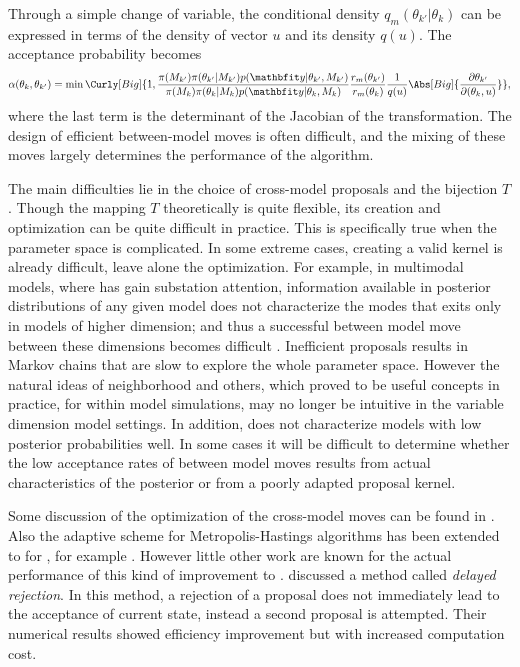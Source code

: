 Through a simple change of variable, the conditional density
$q_m(\theta_{k'}|\theta_k)$ can be expressed in terms of the density of vector
$u$ and its density $q(u)$. The acceptance probability becomes
\begin{equation}
  \alpha(\theta_k,\theta_{k'}) =
  \min\Curly[Big]{1,
    \frac{\pi(M_{k'})\pi(\theta_{k'}|M_{k'})p(\data|\theta_{k'},M_{k'})}
    {\pi(M_k)\pi(\theta_k|M_k)p(\data|\theta_k,M_k)}
    \frac{r_m(\theta_{k'})}{r_m(\theta_k)}
    \frac{1}{q(u)}
    \Abs[Big]{\frac{\partial\theta_{k'}}{\partial(\theta_k,u)}}
  },
\end{equation}
where the last term is the determinant of the Jacobian of the transformation.
The design of efficient between-model moves is often difficult, and the mixing
of these moves largely determines the performance of the algorithm.

The main difficulties lie in the choice of cross-model proposals and the
bijection $T$. Though the mapping $T$ theoretically is quite flexible, its
creation and optimization can be quite difficult in practice. This is
specifically true when the parameter space is complicated. In some extreme
cases, creating a valid kernel is already difficult, leave alone the
optimization. For example, in multimodal models, where \rjmcmc has gain
substation attention, information available in posterior distributions of any
given model does not characterize the modes that exits only in models of
higher dimension; and thus a successful between model move between these
dimensions becomes difficult \cite{Jasra:2007id}. Inefficient proposals
results in Markov chains that are slow to explore the whole parameter space.
However the natural ideas of neighborhood and others, which proved to be
useful concepts in practice, for within model simulations, may no longer be
intuitive in the variable dimension model settings. In addition, \rjmcmc does
not characterize models with low posterior probabilities well. In some cases
it will be difficult to determine whether the low acceptance rates of between
model moves results from actual characteristics of the posterior or from a
poorly adapted proposal kernel.

Some discussion of the optimization of the cross-model moves can be found in
\cite{Green:2009tr}. Also the adaptive scheme for Metropolis-Hastings
algorithms has been extended to for \rjmcmc, for example \cite{Hastie:2005vi}.
However little other work are known for the actual performance of this kind of
improvement to \rjmcmc. \cite{Green:2001tk} discussed a method called
\emph{delayed rejection}. In this method, a rejection of a proposal does not
immediately lead to the acceptance of current state, instead a second proposal
is attempted. Their numerical results showed efficiency improvement but with
increased computation cost.

